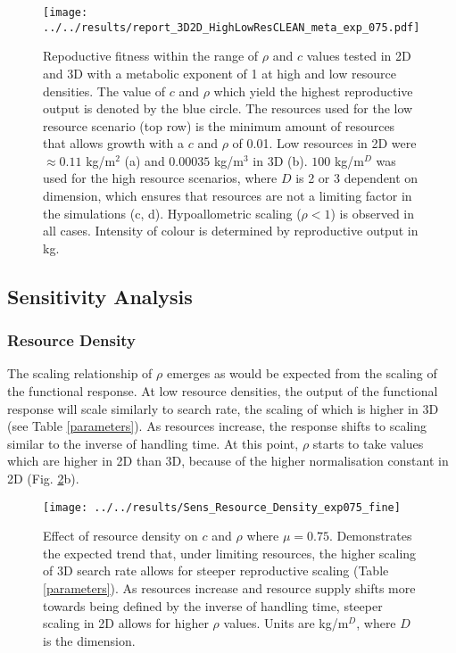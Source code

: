 \documentclass[a4paper, 11pt, hidelinks]{article} %
\begin{document}
	\begin{figure}[H]
		
		
		\centering
		\texttt{[image: ../../results/report\_3D2D\_HighLowResCLEAN\_meta\_exp\_075.pdf]}
		
		\caption{Repoductive fitness within the range of $ \rho $ and $ c $ values tested in 2D and 3D with a metabolic exponent of 1 at high and low resource densities. 
		The value of $ c $ and $ \rho $ which yield the highest reproductive output is denoted by the blue circle.
		The resources used for the low resource scenario (top row) is the minimum amount of resources that allows growth with a $c$ and $\rho$ of 0.01. 
		Low resources in 2D were $ \approx 0.11$ kg/m$^2 $ (a) and $ 0.00035$ kg/m$^3 $ in 3D (b).
		$ 100$ kg/m$^D $ was used for the high resource scenarios, where $D$ is 2 or 3 dependent on dimension, which ensures that resources are not a limiting factor in the simulations (c, d).
		Hypoallometric scaling ($ \rho < 1 $) is observed in all cases.
		Intensity of colour is determined by reproductive output in kg.}
		\label{resources2D3D_meta_exp0.75}
	\end{figure}
	
	\subsection{Sensitivity Analysis}
	\subsubsection{Resource Density}
	The scaling relationship of $\rho$ emerges as would be expected from the scaling of the functional response.  At low resource densities, the output of the functional response will scale similarly to search rate, the scaling of which is higher in 3D (see Table \ref{parameters}).  As resources increase, the response shifts to scaling similar to the inverse of handling time.  At this point, $\rho$ starts to take values which are higher in 2D than 3D, because of the higher normalisation constant in 2D (Fig. \ref{fig:sensresourcedensityexp075fine}b).
	
	\begin{figure}[h!]
		\centering
		\texttt{[image: ../../results/Sens\_Resource\_Density\_exp075\_fine]}
		\caption{Effect of resource density on $c$ and $\rho$ where $\mu = 0.75$.  Demonstrates the expected trend that, under limiting resources, the higher scaling of 3D search rate  allows for steeper reproductive scaling (Table \ref{parameters}).  As resources increase and  resource supply shifts more towards being defined by the inverse of handling time, steeper scaling in 2D allows for higher $\rho$ values.  Units are kg/m$^D$, where $D$ is the dimension.}
		\label{fig:sensresourcedensityexp075fine}
	\end{figure}
\end{document}
